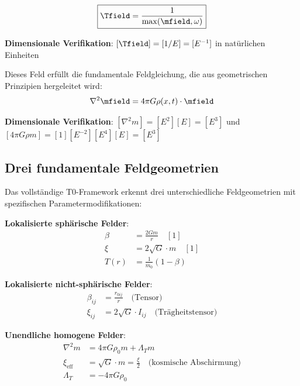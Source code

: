 	\begin{equation}
		\boxed{\Tfield = \frac{1}{\max(\mfield, \omega)}}
		\label{eq:intrinsisches_zeitfeld}
	\end{equation}
	
	\textbf{Dimensionale Verifikation}: $[\Tfield] = [1/E] = [E^{-1}]$ in natürlichen Einheiten \checkmark
	
	Dieses Feld erfüllt die fundamentale Feldgleichung, die aus geometrischen Prinzipien hergeleitet wird:
	\begin{equation}
		\nabla^2 \mfield = 4\pi G \rho(x,t) \cdot \mfield
		\label{eq:feldgleichung}
	\end{equation}
	
	\textbf{Dimensionale Verifikation}: $[\nabla^2 m] = [E^2][E] = [E^3]$ und $[4\pi G \rho m] = [1][E^{-2}][E^4][E] = [E^3]$ \checkmark
	
	\subsection{Drei fundamentale Feldgeometrien}
	\label{subsec:drei_geometrien}
	
	Das vollständige T0-Framework erkennt drei unterschiedliche Feldgeometrien mit spezifischen Parametermodifikationen:
	
	\begin{tcolorbox}[colback=blue!5!white,colframe=blue!75!black,title=T0-Modell-Parameterrahmen]
		\textbf{Lokalisierte sphärische Felder}:
		\begin{align}
			\beta &= \frac{2Gm}{r} \quad [1] \\
			\xi &= 2\sqrt{G} \cdot m \quad [1] \\
			T(r) &= \frac{1}{m_0}(1 - \beta)
		\end{align}
		
		\textbf{Lokalisierte nicht-sphärische Felder}:
		\begin{align}
			\beta_{ij} &= \frac{r_{0ij}}{r} \quad \text{(Tensor)} \\
			\xi_{ij} &= 2\sqrt{G} \cdot I_{ij} \quad \text{(Trägheitstensor)}
		\end{align}
		
		\textbf{Unendliche homogene Felder}:
		\begin{align}
			\nabla^2 m &= 4\pi G \rho_0 m + \Lambda_T m \\
			\xi_{\text{eff}} &= \sqrt{G} \cdot m = \frac{\xi}{2} \quad \text{(kosmische Abschirmung)} \\
			\Lambda_T &= -4\pi G \rho_0
		\end{align}
	\end{tcolorbox}
	
